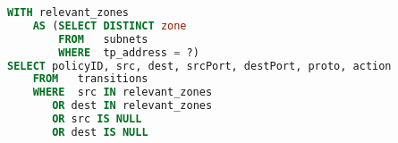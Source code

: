 %
%
%

\begin{lstlisting}[language=sql, breaklines=True, caption=Get Transitions Query, label=Get Transitions Query, sensitive=true]
WITH relevant_zones 
	AS (SELECT DISTINCT zone 
		FROM   subnets 
		WHERE  tp_address = ?) 
SELECT policyID, src, dest, srcPort, destPort, proto, action
	FROM   transitions 
	WHERE  src IN relevant_zones 
	   OR dest IN relevant_zones
	   OR src IS NULL
	   OR dest IS NULL
\end{lstlisting}